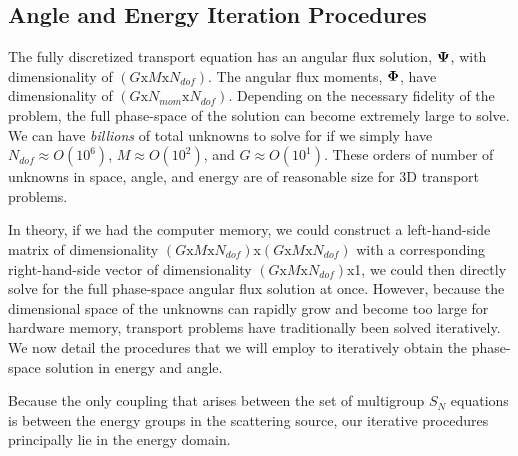\subsection{Angle and Energy Iteration Procedures}
\label{sec::Sn_Solution_Iterative}

The fully discretized transport equation has an angular flux solution, ${\bf \Psi}$, with dimensionality of $(G \text{x} M \text{x} N_{dof})$. The angular flux moments, ${\bf \Phi}$, have dimensionality of $(G \text{x} N_{mom} \text{x} N_{dof})$. Depending on the necessary fidelity of the problem, the full phase-space of the solution can become extremely large to solve. We can have {\em billions} of total unknowns to solve for if we simply have $N_{dof} \approx O(10^6)$, $M \approx O(10^2)$, and $G \approx O(10^1)$. These orders of number of unknowns in space, angle, and energy are of reasonable size for 3D transport problems.

In theory, if we had the computer memory, we could construct a left-hand-side matrix of dimensionality $(G \text{x} M \text{x} N_{dof})$x$(G \text{x} M \text{x} N_{dof})$ with a corresponding right-hand-side vector of dimensionality $(G \text{x} M \text{x} N_{dof})$x1, we could then directly solve for the full phase-space angular flux solution at once. However, because the dimensional space of the unknowns can rapidly grow and become too large for hardware memory, transport problems have traditionally been solved iteratively. We now detail the procedures that we will employ to iteratively obtain the phase-space solution in energy and angle.

Because the only coupling that arises between the set of multigroup $S_N$ equations is between the energy groups in the scattering source, our iterative procedures principally lie in the energy domain. 

